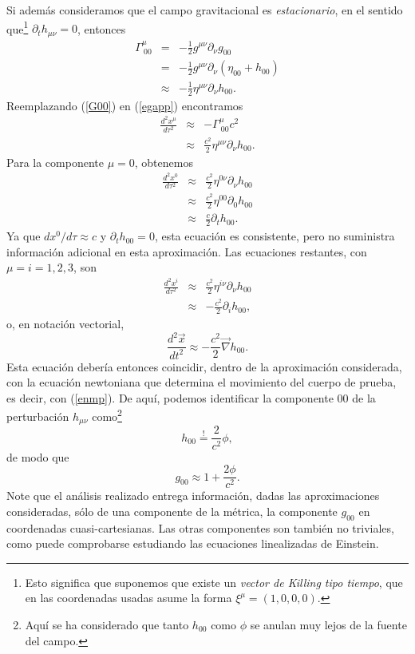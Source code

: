 Si además consideramos que el campo gravitacional es \textit{estacionario}, en el
sentido que\footnote{Esto significa que suponemos que existe un \textit{vector de Killing tipo tiempo}, que en las coordenadas usadas asume la forma $\xi^\mu=(1,0,0,0)$.} $\partial_t h_{\mu\nu}=0$, entonces
\begin{eqnarray}
 \Gamma_{\ 00}^\mu &=&-\frac{1}2g^{\mu\nu}\partial_\nu g_{00} \\
&=&-\frac{1}{2}g^{\mu\nu}
\partial_\nu\left( \eta_{00}+h_{00}\right) \\
&\approx&-\frac{1}2\eta^{\mu\nu}\partial_\nu h_{00}. \label{G00}
\end{eqnarray}
Reemplazando (\ref{G00}) en (\ref{egapp}) encontramos
\begin{eqnarray}
\frac{d^2x^\mu }{d\tau^2}&\approx& -\Gamma_{\ 00}^\mu c^2\\
&\approx& \frac{c^2}2\eta^{\mu\nu}\partial_\nu h_{00} .
\end{eqnarray}
Para la componente $\mu=0$, obtenemos
\begin{eqnarray}
\frac{d^2x^0}{d\tau^2}&\approx& \frac{c^2}2\eta^{0\nu}\partial_\nu h_{00}\\
&\approx& \frac{c^2}{2}\eta^{00}\partial_0 h_{00}\\
&\approx& \frac{c}{2}\partial_t h_{00}.
\end{eqnarray}
Ya que $dx^0/d\tau\approx c$ y $\partial_t h_{00}=0$, esta ecuación es consistente,
pero no suministra información adicional en esta aproximación. Las ecuaciones
restantes, con $\mu=i=1,2,3$, son
\begin{eqnarray}
\frac{d^2x^i}{d\tau^2}&\approx&\frac{c^2}{2}\eta^{i\nu}\partial_\nu h_{00} \\
&\approx&-\frac{c^2}{2}\partial_i h_{00},
\end{eqnarray}
o, en notación vectorial,
\begin{equation}
 \frac{d^2\vec{x}}{dt^2}\approx -\frac{c^2}{2}\vec{\nabla}h_{00}.
\end{equation}
Esta ecuación debería entonces coincidir, dentro de la aproximación considerada,
con la ecuación newtoniana que determina el movimiento del cuerpo de prueba, es decir, con (\ref{enmp}). De aquí, podemos
identificar la componente $00$ de la perturbación $h_{\mu\nu}$ como\footnote{Aquí se ha considerado que tanto $h_{00}$ como $\phi$ se anulan muy lejos de la fuente del campo.}
\begin{equation}
h_{00}\stackrel{!}{=}\frac{2}{c^2}\phi, \label{h00phi}
\end{equation}
de modo que
\begin{equation}
\boxed{g_{00}\approx 1+\frac{2\phi}{c^2}.} \label{g00phi}
\end{equation}
Note que el análisis realizado entrega información, dadas las aproximaciones consideradas, sólo de una componente de la métrica, la componente $g_{00}$ en coordenadas cuasi-cartesianas. Las otras componentes son también no triviales, como puede comprobarse estudiando las ecuaciones linealizadas de Einstein. 

